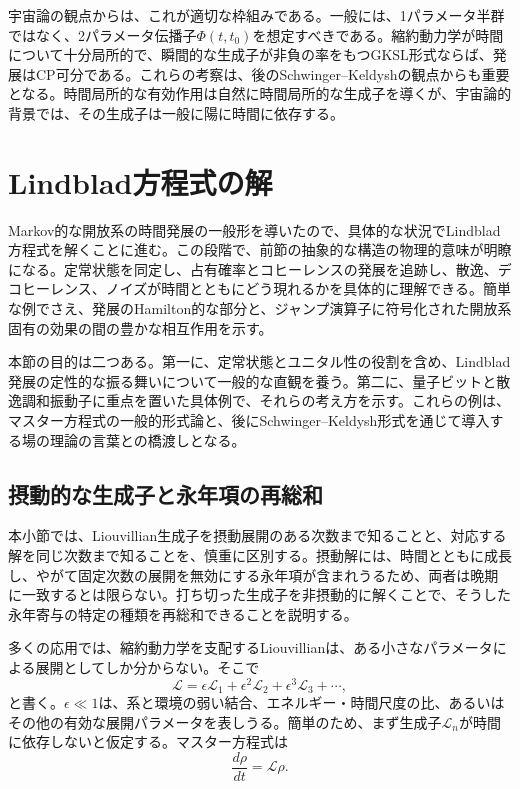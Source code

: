 \documentclass[a4paper,11pt,oneside]{article}
\theoremstyle{definition}
\numberwithin{equation}{section}
\begin{document}
宇宙論の観点からは、これが適切な枠組みである。一般には、1パラメータ半群ではなく、2パラメータ伝播子\(\Phi(t,t_0)\)を想定すべきである。縮約動力学が時間について十分局所的で、瞬間的な生成子が非負の率をもつGKSL形式ならば、発展はCP可分である。これらの考察は、後のSchwinger--Keldyshの観点からも重要となる。時間局所的な有効作用は自然に時間局所的な生成子を導くが、宇宙論的背景では、その生成子は一般に陽に時間に依存する。







\section{Lindblad方程式の解}\label{sec:3}



Markov的な開放系の時間発展の一般形を導いたので、具体的な状況でLindblad方程式を解くことに進む。この段階で、前節の抽象的な構造の物理的意味が明瞭になる。定常状態を同定し、占有確率とコヒーレンスの発展を追跡し、散逸、デコヒーレンス、ノイズが時間とともにどう現れるかを具体的に理解できる。簡単な例でさえ、発展のHamilton的な部分と、ジャンプ演算子に符号化された開放系固有の効果の間の豊かな相互作用を示す。



本節の目的は二つある。第一に、定常状態とユニタル性の役割を含め、Lindblad発展の定性的な振る舞いについて一般的な直観を養う。第二に、量子ビットと散逸調和振動子に重点を置いた具体例で、それらの考え方を示す。これらの例は、マスター方程式の一般的形式論と、後にSchwinger--Keldysh形式を通じて導入する場の理論の言葉との橋渡しとなる。





\subsection{摂動的な生成子と永年項の再総和}\label{ssec:resummation}



本小節では、Liouvillian生成子を摂動展開のある次数まで知ることと、対応する解を同じ次数まで知ることを、慎重に区別する。摂動解には、時間とともに成長し、やがて固定次数の展開を無効にする永年項が含まれうるため、両者は晩期に一致するとは限らない。打ち切った生成子を非摂動的に解くことで、そうした永年寄与の特定の種類を再総和できることを説明する。



多くの応用では、縮約動力学を支配するLiouvillianは、ある小さなパラメータによる展開としてしか分からない。そこで
\begin{equation}\label{generator expansion}
\mathcal{L}
=
\epsilon \mathcal{L}_{1}
+
\epsilon^{2}\mathcal{L}_{2}
+
\epsilon^{3}\mathcal{L}_{3}
+\cdots ,
\end{equation}
と書く。$\epsilon\ll 1$は、系と環境の弱い結合、エネルギー・時間尺度の比、あるいはその他の有効な展開パラメータを表しうる。簡単のため、まず生成子$\mathcal{L}_{n}$が時間に依存しないと仮定する。マスター方程式は
\begin{equation}
\frac{d\rho}{dt}
=
\mathcal{L}\rho .
\end{equation}
\end{document}
